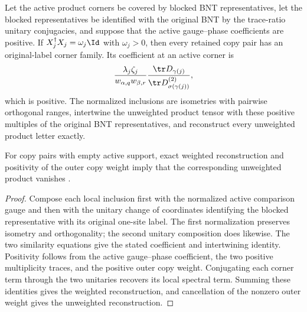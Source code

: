 \begin{lemma}
    \label{thm:mpdo_original_corner_family_exists}
    \leanok
    Let the active product corners be covered by blocked BNT representatives,
    let the blocked representatives be identified with the original BNT by
    the trace-ratio unitary conjugacies, and suppose that the active
    gauge--phase coefficients are positive. If
    $X_j^\dagger X_j=\omega_j\Id$ with $\omega_j>0$, then every retained copy
    pair has an original-label corner family. Its coefficient at an active
    corner is
    \begin{align}
        \frac{\lambda_j\zeta_j}{w_{\alpha,q}w_{\beta,r}}
        \frac{\tr D_{\gamma(j)}}
        {\tr D^{(2)}_{\sigma(\gamma(j))}},
        \notag
    \end{align}
    which is positive. The normalized inclusions are isometries with
    pairwise orthogonal ranges, intertwine the unweighted product tensor with these
    positive multiples of the original BNT representatives, and reconstruct
    every unweighted product letter exactly.

    For copy pairs with empty active support, exact weighted reconstruction and
    positivity of the outer copy weight imply that the corresponding unweighted
    product vanishes \cite{gap:cpsv16_figure11_per_pair_support}.
\end{lemma}

\begin{proof}\leanok
    Compose each local inclusion first with the normalized active comparison
    gauge and then with the unitary change of coordinates identifying the
    blocked representative with its original one-site label. The first
    normalization preserves isometry and orthogonality; the second unitary
    composition does likewise. The two similarity equations give the stated
    coefficient and intertwining identity. Positivity follows from the active
    gauge--phase coefficient, the two positive multiplicity traces, and the
    positive outer copy weight. Conjugating each corner term through the two
    unitaries recovers its local spectral term. Summing these identities gives
    the weighted reconstruction, and cancellation of the nonzero outer weight
    gives the unweighted reconstruction.
\end{proof}

